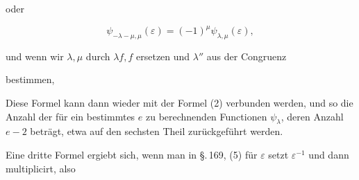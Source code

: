 oder

\[
\psi_{-\lambda-\mu,\mu}(\varepsilon) = (-1)^\mu \psi_{\lambda,\mu}(\varepsilon),
\]

und wenn wir $\lambda,\mu$ durch $\lambda f, f$ ersetzen und $\lambda''$ aus der
Congruenz


bestimmen,


Diese Formel kann dann wieder mit der Formel (2) verbunden
werden, und so die Anzahl der für ein bestimmtes $e$ zu berechnenden
Functionen $\psi_\lambda$, deren Anzahl $e-2$ beträgt, etwa auf den
sechsten Theil zurückgeführt werden.

Eine dritte Formel ergiebt sich, wenn man in \S.\,169, (5) für
$\varepsilon$ setzt $\varepsilon^{-1}$ und dann multiplicirt, also
